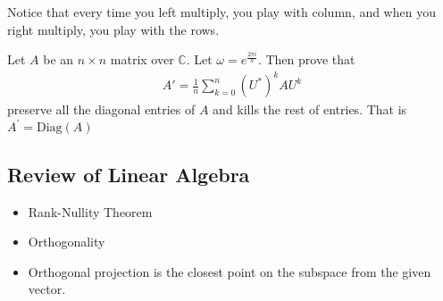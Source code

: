 Notice that every time you left multiply, you play with column, and
when you right multiply, you play with the rows.

\begin{exercise}
  Let $A$ be an $n \times n$ matrix over $\mathbb{C}$. Let $\omega =
  e^{ \frac{2\pi i}{n}}$. Then prove that
  \begin{align*}
    A' = \frac{1}{n} \sum_{k = 0}^{n} (U^*)^kAU^k
  \end{align*}
  preserve all the diagonal entries of $A$ and kills the rest of
  entries. That is $A^\prime = \text{Diag}(A)$
\end{exercise}

\subsection{Review of Linear Algebra}

\begin{itemize}
  \item Rank-Nullity Theorem
  \item Orthogonality
  \item Orthogonal projection is the closest point on the subspace
    from the given vector.
\end{itemize}
